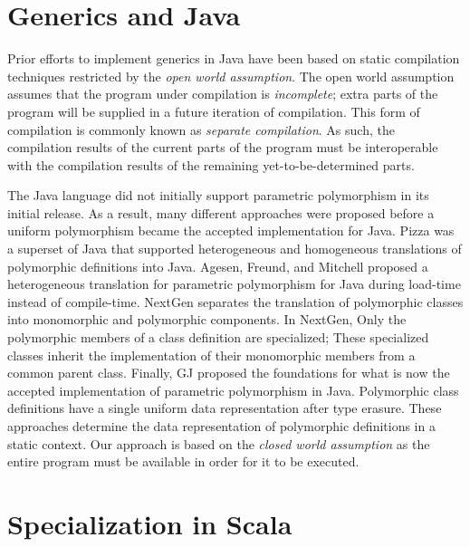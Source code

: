 \section{Generics and Java}

Prior efforts to implement generics in Java have been based on static compilation techniques restricted by the \textit{open world assumption}.
The open world assumption assumes that the program under compilation is \textit{incomplete}; extra parts of the program will be supplied in a future iteration of compilation.
This form of compilation is commonly known as \textit{separate compilation}.
As such, the compilation results of the current parts of the program must be interoperable with the compilation results of the remaining yet-to-be-determined parts.

The Java language did not initially support parametric polymorphism in its initial release.
As a result, many different approaches were proposed before a uniform polymorphism became the accepted implementation for Java.
Pizza\cite{java:pizza} was a superset of Java that supported heterogeneous and homogeneous translations of polymorphic definitions into Java.
Agesen, Freund, and Mitchell proposed a heterogeneous translation for parametric polymorphism for Java during load-time instead of compile-time\cite{java:agesen-type-params}.
NextGen\cite{java:nextgen} separates the translation of polymorphic classes into monomorphic and polymorphic components.
In NextGen, Only the polymorphic members of a class definition are specialized; These specialized classes inherit the implementation of their monomorphic members from a common parent class.
Finally, GJ\cite{java:odersky-type-params} proposed the foundations for what is now the accepted implementation of parametric polymorphism in Java.
Polymorphic class definitions have a single uniform data representation after type erasure.
These approaches determine the data representation of polymorphic definitions in a static context.
Our approach is based on the \textit{closed world assumption} as the entire program must be available in order for it to be executed.

\section{Specialization in Scala}

